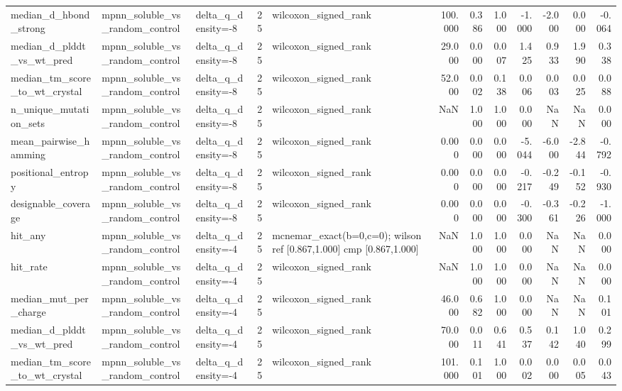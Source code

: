 \begin{table}
{\begin{tabular}{lllrlrrrrrrr}
median\_d\_hbond\_strong & mpnn\_soluble\_vs\_random\_control & delta\_q\_density=-8 & 25 & wilcoxon\_signed\_rank & 100.000 & 0.386 & 1.000 & -1.000 & -2.000 & 0.000 & -0.064 \\
median\_d\_plddt\_vs\_wt\_pred & mpnn\_soluble\_vs\_random\_control & delta\_q\_density=-8 & 25 & wilcoxon\_signed\_rank & 29.000 & 0.000 & 0.007 & 1.425 & 0.933 & 1.990 & 0.338 \\
median\_tm\_score\_to\_wt\_crystal & mpnn\_soluble\_vs\_random\_control & delta\_q\_density=-8 & 25 & wilcoxon\_signed\_rank & 52.000 & 0.002 & 0.138 & 0.006 & 0.003 & 0.025 & 0.088 \\
n\_unique\_mutation\_sets & mpnn\_soluble\_vs\_random\_control & delta\_q\_density=-8 & 25 & wilcoxon\_signed\_rank & NaN & 1.000 & 1.000 & 0.000 & NaN & NaN & 0.000 \\
mean\_pairwise\_hamming & mpnn\_soluble\_vs\_random\_control & delta\_q\_density=-8 & 25 & wilcoxon\_signed\_rank & 0.000 & 0.000 & 0.000 & -5.044 & -6.000 & -2.844 & -0.792 \\
positional\_entropy & mpnn\_soluble\_vs\_random\_control & delta\_q\_density=-8 & 25 & wilcoxon\_signed\_rank & 0.000 & 0.000 & 0.000 & -0.217 & -0.249 & -0.152 & -0.930 \\
designable\_coverage & mpnn\_soluble\_vs\_random\_control & delta\_q\_density=-8 & 25 & wilcoxon\_signed\_rank & 0.000 & 0.000 & 0.000 & -0.300 & -0.361 & -0.226 & -1.000 \\
hit\_any & mpnn\_soluble\_vs\_random\_control & delta\_q\_density=-4 & 25 & mcnemar\_exact(b=0,c=0); wilson ref [0.867,1.000] cmp [0.867,1.000] & NaN & 1.000 & 1.000 & 0.000 & NaN & NaN & 0.000 \\
hit\_rate & mpnn\_soluble\_vs\_random\_control & delta\_q\_density=-4 & 25 & wilcoxon\_signed\_rank & NaN & 1.000 & 1.000 & 0.000 & NaN & NaN & 0.000 \\
median\_mut\_per\_charge & mpnn\_soluble\_vs\_random\_control & delta\_q\_density=-4 & 25 & wilcoxon\_signed\_rank & 46.000 & 0.682 & 1.000 & 0.000 & NaN & NaN & 0.101 \\
median\_d\_plddt\_vs\_wt\_pred & mpnn\_soluble\_vs\_random\_control & delta\_q\_density=-4 & 25 & wilcoxon\_signed\_rank & 70.000 & 0.011 & 0.641 & 0.537 & 0.142 & 1.040 & 0.299 \\
median\_tm\_score\_to\_wt\_crystal & mpnn\_soluble\_vs\_random\_control & delta\_q\_density=-4 & 25 & wilcoxon\_signed\_rank & 101.000 & 0.101 & 1.000 & 0.002 & 0.000 & 0.005 & 0.043 \\

\end{tabular}}
\end{table}
